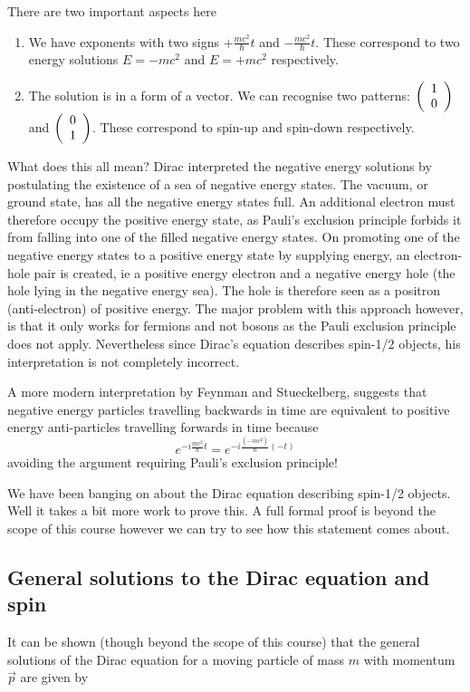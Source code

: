 There are two important aspects here
\begin{enumerate}
\item We have exponents with two signs $+\frac{mc^2}{\hbar}t$ and $-\frac{mc^2}{\hbar}t$. These correspond to two energy solutions $E=-mc^2$ and $E=+mc^2$ respectively.
\item The solution is in a form of a vector. We can recognise two patterns: $ \left( \begin{array}{c} 1 \\ 0 \end{array} \right)$ and $ \left( \begin{array}{c} 0 \\ 1 \end{array} \right)$. These correspond to spin-up and spin-down respectively.
\end{enumerate}
What does this all mean? Dirac interpreted the negative energy solutions by postulating the existence of a sea of negative energy states. The vacuum, or ground state, has all the negative energy states full. An additional electron must therefore occupy the positive energy state, as Pauli's exclusion principle forbids it from falling into one of the filled negative energy states. On promoting one of the negative energy states to a positive energy state by supplying energy, an electron-hole pair is created, ie a positive energy electron and a negative energy hole (the hole lying in the negative energy sea). The hole is therefore seen as a positron (anti-electron) of positive energy. The major problem with this approach however, is that it only works for fermions and not bosons as the Pauli exclusion principle does not apply. Nevertheless since Dirac's equation describes spin-1/2 objects, his interpretation is not completely incorrect. 

A more modern interpretation by Feynman and Stueckelberg, suggests that negative energy particles travelling backwards in time are equivalent to positive energy anti-particles travelling forwards in time because
\[
e^{-i\frac{mc^2}{\hbar}t}=e^{-i\frac{(-mc^2)}{\hbar}(-t)}
\]
avoiding the argument requiring Pauli's exclusion principle!

We have been banging on about the Dirac equation describing spin-1/2 objects. Well it takes a bit more work to prove this. A full formal proof is beyond the scope of this course however we can try to see how this statement comes about.

\subsection{General solutions to the Dirac equation and spin}

It can be shown (though beyond the scope of this course) that the general solutions of the Dirac
equation for a moving particle of mass $m$ with momentum $\vec{p}$ are given by
   

